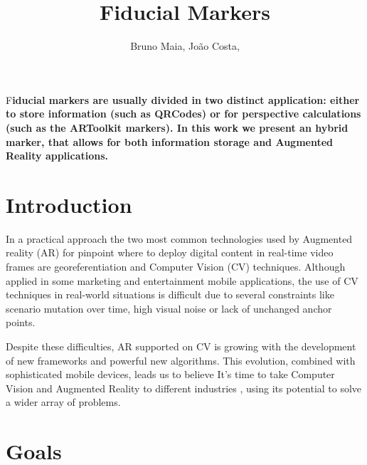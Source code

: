 \documentclass[DIV=calc, paper=a4, fontsize=11pt, twocolumn]{scrartcl}	 %
\title{Fiducial Markers} %
\author{Bruno Maia, Jo\~{a}o Costa, } %
\date{} %
\newcommand{\initial}[1]{ %
\lettrine[lines=3,lhang=0.3,nindent=0em]{
\color{DarkGoldenrod}
{\textsf{#1}}}{}}
\begin{document}
\maketitle %

\thispagestyle{fancy} %


\initial{F}\textbf{iducial markers are usually divided in two distinct application: either to store information (such as QRCodes) or for perspective calculations (such as the ARToolkit markers).
In this work we present an hybrid marker, that allows for both information storage and Augmented Reality applications.}


\section*{Introduction}

In a practical approach the two most common technologies used by Augmented reality (AR) for pinpoint where to deploy digital content in real-time video frames are georeferentiation and Computer Vision (CV) techniques. Although  applied in some marketing and entertainment mobile applications,  the use of CV techniques in real-world situations is
difficult due to several constraints like scenario mutation over time, high visual noise or lack of unchanged anchor points.
 

Despite these difficulties, AR supported on CV is growing with the development of new frameworks and powerful new algorithms. This evolution, combined with sophisticated mobile devices, leads us to believe It's time to take Computer Vision and Augmented Reality to different industries , using its potential to solve a wider array of problems.



\section*{Goals}
\end{document}
